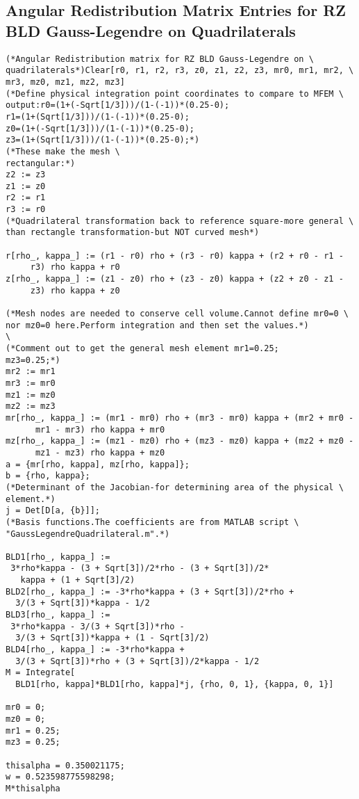 \documentclass{article}
\begin{document}
\subsection{Angular Redistribution Matrix Entries for RZ BLD Gauss-Legendre on Quadrilaterals}

\begin{verbatim}
(*Angular Redistribution matrix for RZ BLD Gauss-Legendre on \
quadrilaterals*)Clear[r0, r1, r2, r3, z0, z1, z2, z3, mr0, mr1, mr2, \
mr3, mz0, mz1, mz2, mz3]
(*Define physical integration point coordinates to compare to MFEM \
output:r0=(1+(-Sqrt[1/3]))/(1-(-1))*(0.25-0);
r1=(1+(Sqrt[1/3]))/(1-(-1))*(0.25-0);
z0=(1+(-Sqrt[1/3]))/(1-(-1))*(0.25-0);
z3=(1+(Sqrt[1/3]))/(1-(-1))*(0.25-0);*)
(*These make the mesh \
rectangular:*)
z2 := z3
z1 := z0
r2 := r1
r3 := r0
(*Quadrilateral transformation back to reference square-more general \
than rectangle transformation-but NOT curved mesh*)

r[rho_, kappa_] := (r1 - r0) rho + (r3 - r0) kappa + (r2 + r0 - r1 - 
     r3) rho kappa + r0
z[rho_, kappa_] := (z1 - z0) rho + (z3 - z0) kappa + (z2 + z0 - z1 - 
     z3) rho kappa + z0

(*Mesh nodes are needed to conserve cell volume.Cannot define mr0=0 \
nor mz0=0 here.Perform integration and then set the values.*)
\
(*Comment out to get the general mesh element mr1=0.25;
mz3=0.25;*)
mr2 := mr1
mr3 := mr0
mz1 := mz0
mz2 := mz3
mr[rho_, kappa_] := (mr1 - mr0) rho + (mr3 - mr0) kappa + (mr2 + mr0 -
      mr1 - mr3) rho kappa + mr0
mz[rho_, kappa_] := (mz1 - mz0) rho + (mz3 - mz0) kappa + (mz2 + mz0 -
      mz1 - mz3) rho kappa + mz0
a = {mr[rho, kappa], mz[rho, kappa]};
b = {rho, kappa};
(*Determinant of the Jacobian-for determining area of the physical \
element.*)
j = Det[D[a, {b}]];
(*Basis functions.The coefficients are from MATLAB script \
"GaussLegendreQuadrilateral.m".*)

BLD1[rho_, kappa_] := 
 3*rho*kappa - (3 + Sqrt[3])/2*rho - (3 + Sqrt[3])/2*
   kappa + (1 + Sqrt[3]/2)
BLD2[rho_, kappa_] := -3*rho*kappa + (3 + Sqrt[3])/2*rho + 
  3/(3 + Sqrt[3])*kappa - 1/2
BLD3[rho_, kappa_] := 
 3*rho*kappa - 3/(3 + Sqrt[3])*rho - 
  3/(3 + Sqrt[3])*kappa + (1 - Sqrt[3]/2)
BLD4[rho_, kappa_] := -3*rho*kappa + 
  3/(3 + Sqrt[3])*rho + (3 + Sqrt[3])/2*kappa - 1/2
M = Integrate[
  BLD1[rho, kappa]*BLD1[rho, kappa]*j, {rho, 0, 1}, {kappa, 0, 1}]

mr0 = 0;
mz0 = 0;
mr1 = 0.25;
mz3 = 0.25;

thisalpha = 0.350021175;
w = 0.523598775598298;
M*thisalpha
\end{verbatim}
\end{document}
